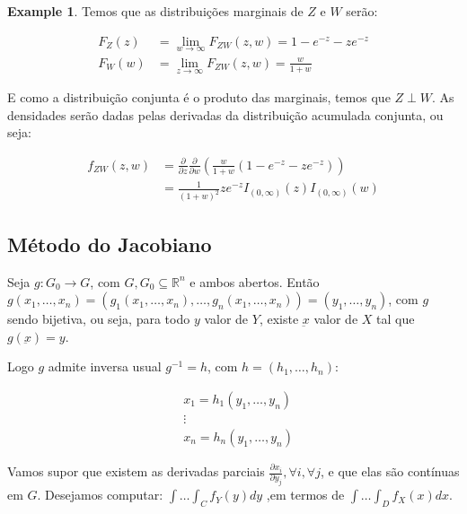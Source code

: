 \documentclass[
]{article}
\theoremstyle{definition}
\theoremstyle{definition}
\newtheorem{example}{Example}[section]
\theoremstyle{definition}
\theoremstyle{definition}
\theoremstyle{remark}
\begin{document}
\begin{example}
Temos que as distribuições marginais de \(Z\) e \(W\) serão:

\begin{align*}
F_{Z}(z) &= \lim_{w \to \infty}F_{ZW}(z,w) = 1-e^{-z}-ze^{-z} \\
F_{W}(w) &= \lim_{z \to \infty}F_{ZW}(z,w) = \frac{w}{1+w}
\end{align*}

E como a distribuição conjunta é o produto das marginais, temos que \(Z \perp W\). As densidades serão dadas pelas derivadas da distribuição acumulada conjunta, ou seja:

\begin{align*}
f_{ZW}(z,w) &= \frac{\partial}{\partial z}\frac{\partial}{\partial w}\left(\frac{w}{1+w}\left(1-e^{-z}-ze^{-z}\right)\right) \\
&= \frac{1}{(1+w)^{2}}ze^{-z}I_{(0,\infty)}(z)I_{(0,\infty)}(w)
\end{align*}
\end{example}

\hypertarget{muxe9todo-do-jacobiano}{%
\subsection{Método do Jacobiano}\label{muxe9todo-do-jacobiano}}

Seja \(g:G_{0} \to G\), com \(G,G_{0} \subseteq \mathbb{R}^{n}\) e ambos abertos. Então \(g(x_{1},\ldots,x_{n}) = \left(g_{1}(x_{1},\ldots,x_{n}),\ldots,g_{n}(x_{1},\ldots,x_{n})\right) = (y_{1},\ldots,y_{n})\), com \(g\) sendo bijetiva, ou seja, para todo \(y\) valor de \(Y\), existe \(\underbar{x}\) valor de \(X\) tal que \(g(\underbar{x}) = y\).

Logo \(g\) admite inversa usual \(g^{-1} = h\), com \(h = (h_{1}, \ldots, h_{n})\):

\begin{align*}
&x_{1} = h_{1}(y_{1},\ldots,y_{n}) \\
&\vdots \\
&x_{n} = h_{n}(y_{1},\ldots,y_{n})
\end{align*}

Vamos supor que existem as derivadas parciais \(\frac{\partial x_{i}}{\partial y_{j}}, \forall i, \forall j\), e que elas são contínuas em \(G\). Desejamos computar: \(\int \ldots \int_{C}f_{Y}(y)dy\) ,em termos de \(\int \ldots \int_{D}f_{X}(x)dx\).
\end{document}
